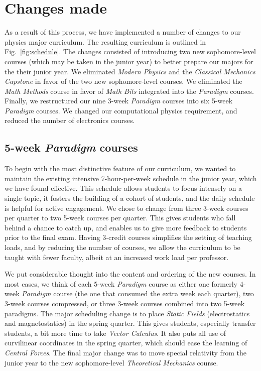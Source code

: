 \documentclass[english,aps,pra,reprint,noshowpacs,superscriptaddress]{revtex4-1}
\begin{document}
\section{Changes made}
As a result of this process, we have implemented a number of changes
to our physics major curriculum.  The resulting curriculum is outlined
in Fig.~\ref{fig:schedule}.  The changes consisted of introducing two
new sophomore-level courses (which may be taken in the junior year) to
better prepare our majors for the their junior year.  We eliminated \emph{Modern
Physics} and the \emph{Classical Mechanics Capstone} in favor of the two new
sophomore-level courses.  We eliminated the \emph{Math Methods} course in
favor of \emph{Math Bits} integrated into the \emph{Paradigm} courses.
Finally, we restructured our nine 3-week \emph{Paradigm} courses into six
5-week \emph{Paradigm} courses.  We changed our computational physics requirement,
and reduced the number of electronics courses.

\subsection{5-week \emph{Paradigm} courses}
To begin with the most distinctive feature of our curriculum, we
wanted to maintain the existing intensive 7-hour-per-week schedule in
the junior year, which we have found effective.  This schedule allows students to focus
intensely on a single topic, it fosters the building of a cohort of students, and 
the daily schedule is helpful for active engagement.  We chose to
change from three 3-week courses per quarter to two 5-week courses
per quarter.  This gives students who fall behind a chance to catch up, and enables
us to give more feedback to students prior to the final exam.  Having 3-credit courses
simplifies the setting of teaching loads, and by reducing the number of courses, 
we allow the curriculum to be taught with fewer faculty, albeit at an increased
work load per professor.

We put considerable thought into the content and ordering of the new
courses.  In most cases, we think of each 5-week \emph{Paradigm} course as either
one formerly 4-week \emph{Paradigm} course (the one that consumed the extra week
each quarter), two 3-week courses compressed, or three 3-week courses combined
into two 5-week paradigms.  The major
scheduling change is to place \emph{Static Fields} (electrostatics and
magnetostatics) in the spring quarter.  
This gives students, especially transfer students, 
a bit more time to take \emph{Vector Calculus}.  It also puts all use of
curvilinear coordinates in the spring quarter, which should ease the
learning of \emph{Central Forces}.  The final major change was to move
special relativity from the junior year to the new sophomore-level
\emph{Theoretical Mechanics} course.
\end{document}
